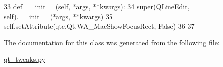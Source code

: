 \begin{DoxyCode}
33     \textcolor{keyword}{def }\hyperlink{classsoftware_1_1chipwhisperer_1_1common_1_1utils_1_1qt__tweaks_1_1QLineEdit_a58754818c0ff325a27bb243e4d942740}{\_\_init\_\_}(self, *args, **kwargs):
34         super(QLineEdit, self).\hyperlink{classsoftware_1_1chipwhisperer_1_1common_1_1utils_1_1qt__tweaks_1_1QLineEdit_a58754818c0ff325a27bb243e4d942740}{\_\_init\_\_}(*args, **kwargs)
35         self.setAttribute(qtc.Qt.WA\_MacShowFocusRect, \textcolor{keyword}{False})
36 
37 
\end{DoxyCode}


The documentation for this class was generated from the following file\+:\begin{DoxyCompactItemize}
\item 
\hyperlink{qt__tweaks_8py}{qt\+\_\+tweaks.\+py}\end{DoxyCompactItemize}
